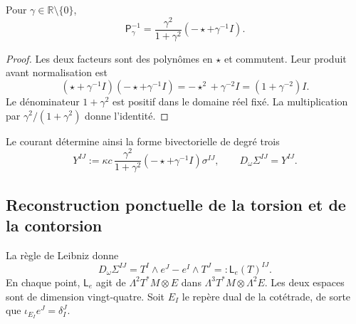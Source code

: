 \begin{lemma}
\label{vii:vii:lem:inversa-holst}
Pour \(\gamma\in\mathbb R\setminus\{0\}\),
\begin{equation}
 \mathsf P_\gamma^{-1}
 =\frac{\gamma^2}{1+\gamma^2}
                      (-\star+\gamma^{-1}I).
 \label{vii:vii:eq:inversa-holst}
\end{equation}
\end{lemma}
\begin{proof}
Les deux facteurs sont des polynômes en \(\star\) et commutent. Leur produit
avant normalisation est
\[
 (\star+\gamma^{-1}I)(-\star+\gamma^{-1}I)
 =-\star^2+\gamma^{-2}I=(1+\gamma^{-2})I.
\]
Le dénominateur \(1+\gamma^2\) est positif dans le domaine réel fixé. La multiplication par \(\gamma^2/(1+\gamma^2)\) donne l'identité.
\end{proof}

Le courant détermine ainsi la forme bivectorielle de degré trois
\begin{equation}
 Y^{IJ}:=\kappa c\,
   \frac{\gamma^2}{1+\gamma^2}
   (-\star+\gamma^{-1}I)\sigma^{IJ},
 \qquad D_\omega\Sigma^{IJ}=Y^{IJ}.
 \label{vii:vii:eq:corriente-dualizada}
\end{equation}

\subsection{Reconstruction ponctuelle de la torsion et de la contorsion}
\label{vii:vii:subsec:reconstruccion-torsion}

La règle de Leibniz donne
\begin{equation}
 D_\omega\Sigma^{IJ}
 =T^I\wedge e^J-e^I\wedge T^J
 =:\mathsf L_e(T)^{IJ}.
 \label{vii:vii:eq:mapa-torsion}
\end{equation}
En chaque point, \(\mathsf L_e\) agit de \(\Lambda^2T^*M\otimes E\) dans \(\Lambda^3T^*M\otimes\Lambda^2E\). Les deux espaces sont de dimension vingt-quatre. Soit \(E_I\) le repère dual de la cotétrade, de sorte que \(\iota_{E_I}e^J=\delta_I^J\).

